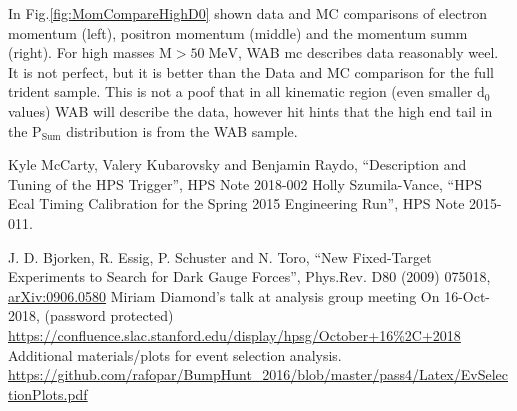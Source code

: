\documentclass[letterpaper,12pt]{article}
\begin{document}
In Fig.\ref{fig:MomCompareHighD0} shown data and MC comparisons of electron momentum (left),
positron momentum (middle) and the momentum summ (right). For high masses $\mathrm{M > 50\;MeV}$, WAB mc describes data reasonably weel. It is not perfect, but it is better than
the Data and MC comparison for the full trident sample.
This is not a poof that in all kinematic region (even smaller $\mathrm{d_{0}}$ values)
WAB will describe the data, however hit hints that the high end tail in the 
$\mathrm{P_{Sum}}$ distribution is from the WAB sample.

 
\clearpage
\begin{thebibliography}{55}
  Kyle McCarty, Valery Kubarovsky and Benjamin Raydo, ``Description and Tuning of the HPS Trigger'', HPS Note 2018-002
  Holly Szumila-Vance, ``HPS Ecal Timing Calibration for the
Spring 2015 Engineering Run'', HPS Note 2015-011.

 J. D. Bjorken, R. Essig, P. Schuster and N. Toro,
``New Fixed-Target Experiments to Search for Dark Gauge Forces'', Phys.Rev. D80 (2009) 075018, \href{https://arxiv.org/abs/0906.0580}{arXiv:0906.0580}
 Miriam Diamond's talk at analysis group meeting On 16-Oct-2018, (password protected) \href{https://confluence.slac.stanford.edu/display/hpsg/October+16%2C+2018}{https://confluence.slac.stanford.edu/display/hpsg/October+16\%2C+2018}
 Additional materials/plots for event selection analysis.\\
\href{https://github.com/rafopar/BumpHunt_2016/blob/master/pass4/Latex/EvSelectionPlots.pdf}{https://github.com/rafopar/BumpHunt\_2016/blob/master/pass4/Latex/EvSelectionPlots.pdf}
\end{thebibliography}
\end{document}
